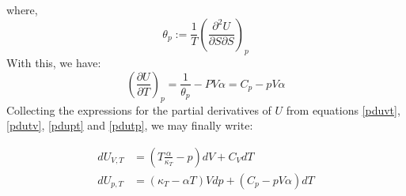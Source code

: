 \documentclass[a4paper]{article}
\newcommand{\pd}[3]{\left(\frac{\partial {#1}}{\partial {#2}}\right)_{#3}}
\newcommand{\pdd}[3]{\left(\frac{\partial^2 {#1}}{\partial {#2}\partial {#3}}\right)}
\begin{document}
where,
\begin{equation}
    \theta_p:=\frac{1}{T}\pdd{U}{S}{S}_p
\end{equation}
With this, we have:
\begin{equation}
    \pd{U}{T}{p}=\frac{1}{\theta_p}-PV\alpha=C_p-pV\alpha \label{pdutp}
\end{equation}
Collecting the expressions for the partial derivatives of $U$ from equations \ref{pduvt}, \ref{pdutv}, \ref{pdupt} and \ref{pdutp}, we may finally write:
\begin{framed}
    \begin{align}
        dU_{V,T}&=\left( T\frac{\alpha}{\kappa_T}-p \right) dV + C_V dT \\
        dU_{p,T}&=\left( \kappa_T -\alpha T \right) V dp+\left( C_p -pV\alpha  \right) dT
    \end{align}
\end{framed}
\end{document}
